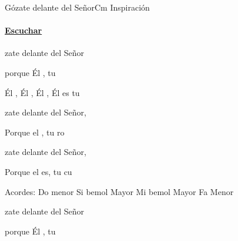 \documentclass[12pt, spanish]{book}
\begin{document}
    \begin{song}{Gózate delante del Señor}{Cm}
    {} %
    {Inspiración}
    {} %
    {}
        \ifChordBk
        \paragraph{\mbox{}\hfill\protect\href{https://open.spotify.com/intl-es/track/4mM9MYayjcm3KibuCp2P72}{Escuchar}\mbox{}\hfill}
        \fi

        \begin{SBOpGroup}
            zate delante del Señor

            porque Él , tu 
        \end{SBOpGroup}

        \begin{SBChorus}
            Él ,   Él ,   Él ,   Él es tu 
        \end{SBChorus}

        \begin{SBOpGroup}
            zate delante del Señor,

            Porque el , tu ro
        \end{SBOpGroup}

        \begin{SBOpGroup}
            zate delante del Señor,

            Porque el es, tu cu
        \end{SBOpGroup}

        \ifChordBk
        \begin{SBOpGroup}
            Acordes:\break
            \upchord{\Cm}Do menor \hfill
            \upchord{\Bflat}\qquad Si bemol Mayor \hfill\null\break
            \upchord{\Eflat}\qquad Mi bemol Mayor \hfill
            \upchord{\Fm}\qquad Fa Menor \hfill\null\break
        \end{SBOpGroup}
        \clearpage
        \fi
        \begin{SBExtraKeys}{

            \begin{SBOpGroup}
                zate delante del Señor

                porque Él , tu 
            \end{SBOpGroup}

}
\end{SBExtraKeys}
\end{song}
\end{document}
